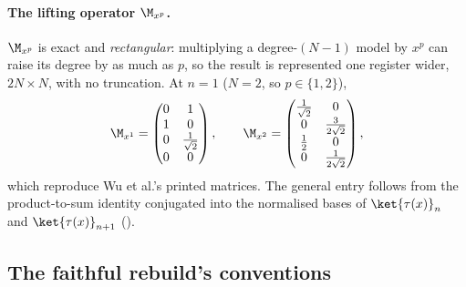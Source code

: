 \paragraph{The lifting operator $\M_{x^p}$.} $\M_{x^p}$ is exact and
\emph{rectangular}: multiplying a degree-$(N{-}1)$ model by $x^p$ can raise its
degree by as much as $p$, so the result is represented one register wider,
$2N \times N$, with no truncation. At $n=1$ ($N=2$, so $p \in \{1,2\}$),
\begin{equation}
    \M_{x^1} =
    \begin{pmatrix}
        0 & 1 \\
        1 & 0 \\
        0 & \tfrac{1}{\sqrt2} \\
        0 & 0
    \end{pmatrix},
    \qquad
    \M_{x^2} =
    \begin{pmatrix}
        \tfrac{1}{\sqrt2} & 0 \\
        0 & \tfrac{3}{2\sqrt2} \\
        \tfrac{1}{2} & 0 \\
        0 & \tfrac{1}{2\sqrt2}
    \end{pmatrix},
    \label{eq:app-Mxp-example}
\end{equation}
which reproduce Wu et al.'s printed matrices. The general entry follows from the product-to-sum identity conjugated into the normalised bases of $\ket{\tau(x)}_n$ and $\ket{\tau(x)}_{n+1}$ ().
\subsection{The faithful rebuild's conventions}
\label{app:faithful-conventions}

